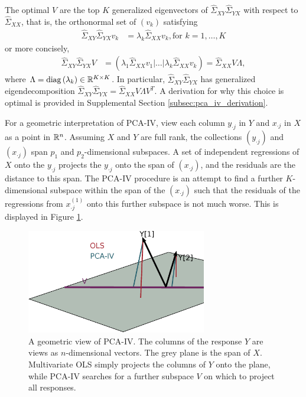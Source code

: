 \documentclass[14pt]{extarticle}
\begin{document}
The optimal $V$ are the top $K$ generalized eigenvectors of
$\hat{\Sigma}_{XY}\hat{\Sigma}_{YX}$ with respect to $\hat{\Sigma}_{XX}$, that
is, the orthonormal set of $\left(v_{k}\right)$ satisfying
\begin{align*}
  \hat{\Sigma}_{XY}\hat{\Sigma}_{YX}v_{k} &= \lambda_{k}
  \hat{\Sigma}_{XX}v_{k}, \text{for } k = 1, \dots, K
\end{align*}
or more concisely,
\begin{align*}
\hat{\Sigma}_{XY}\hat{\Sigma}_{YX}V &= \left( \lambda_{1}
  \hat{\Sigma}_{XX}v_{1} \vert \dots \vert
  \lambda_{k}\hat{\Sigma}_{XX}v_{k}\right) =
\hat{\Sigma}_{XX}V\Lambda,
\end{align*}
where $\Lambda = \mathop\mathrm{diag}\left(\lambda_{k}\right) \in \mathbb{R}^{K \times K}$. In
particular, $\hat{\Sigma}_{XY}\hat{\Sigma}_{YX}$ has generalized
eigendecomposition $\hat{\Sigma}_{XY}\hat{\Sigma}_{YX} = \hat{\Sigma}_{XX}
V\Lambda V^{T}$. A derivation for why this choice is optimal is provided in
Supplemental Section \ref{subsec:pca_iv_derivation}.

For a geometric interpretation of PCA-IV, view each column $y_{\cdot j}$ in $Y$
and $x_{\cdot j}$ in $X$ as a point in $\mathbb{R}^{n}$. Assuming $X$ and $Y$ are
full rank, the collections $\left(y_{ \cdot j}\right)$ and $\left(x_{\cdot
  j}\right)$ span $p_{1}$ and $p_{2}$-dimensional subspaces. A set of
independent regressions of $X$ onto the $y_{\cdot j}$ projects the $y_{\cdot j}$
onto the span of $\left(x_{\cdot j}\right)$, and the residuals are the distance
to this span. The PCA-IV procedure is an attempt to find a further
$K$-dimensional subspace within the span of the $\left(x_{\cdot j}\right)$ such
that the residuals of the regressions from $x_{\cdot j}^{(1)}$ onto this further
subspace is not much worse. This is displayed in Figure
\ref{fig:pca_iv_geometry}.

\begin{figure}
  \centering
  \includegraphics[width=0.7\textwidth]{figure/pca_iv/pca_iv_geometry}
  \caption{A geometric view of PCA-IV. The columns of the response $Y$ are views
    as $n$-dimensional vectors. The grey plane is the span of
    $X$. Multivariate OLS simply projects the columns of $Y$ onto the plane,
    while PCA-IV searches for a further subspace $V$ on which to project all
    responses. \label{fig:pca_iv_geometry} }
\end{figure}
\end{document}
